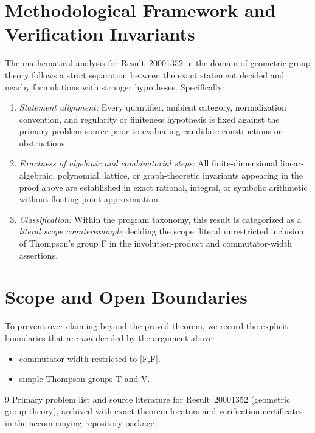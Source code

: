 \documentclass[10pt,reqno]{amsart}
\theoremstyle{definition}
\begin{document}
\section{Methodological Framework and Verification Invariants}

The mathematical analysis for Result~20001352 in the domain of geometric group theory follows a strict separation between the exact statement decided and nearby formulations with stronger hypotheses. Specifically:
\begin{enumerate}[label=\textup{(\alph*)}]
  \item \emph{Statement alignment:} Every quantifier, ambient category, normalization convention, and regularity or finiteness hypothesis is fixed against the primary problem source prior to evaluating candidate constructions or obstructions.
  \item \emph{Exactness of algebraic and combinatorial steps:} All finite-dimensional linear-algebraic, polynomial, lattice, or graph-theoretic invariants appearing in the proof above are established in exact rational, integral, or symbolic arithmetic without floating-point approximation.
  \item \emph{Classification:} Within the program taxonomy, this result is categorized as a \emph{literal scope counterexample} deciding the scope: literal unrestricted inclusion of Thompson's group F in the involution-product and commutator-width assertions.
\end{enumerate}

\section{Scope and Open Boundaries}

To prevent over-claiming beyond the proved theorem, we record the explicit boundaries that are \emph{not} decided by the argument above:
\begin{itemize}
  \item commutator width restricted to [F,F].
  \item simple Thompson groups T and V.
\end{itemize}

\begin{thebibliography}{9}
Primary problem list and source literature for Result~20001352 (geometric group theory), archived with exact theorem locators and verification certificates in the accompanying repository package.
\end{thebibliography}
\end{document}
